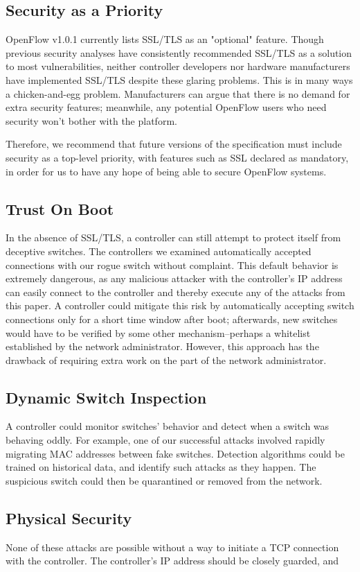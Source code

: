 \subsection{Security as a Priority}

OpenFlow v1.0.1 currently lists SSL/TLS as an "optional" feature. Though previous security analyses have consistently recommended SSL/TLS as a solution to most vulnerabilities, neither controller developers nor hardware manufacturers have implemented SSL/TLS despite these glaring problems. This is in many ways a chicken-and-egg problem. Manufacturers can argue that there is no demand for extra security features; meanwhile, any potential OpenFlow users who need security won't bother with the platform.

Therefore, we recommend that future versions of the specification must include security as a top-level priority, with features such as SSL declared as mandatory, in order for us to have any hope of being able to secure OpenFlow systems. 

\subsection{Trust On Boot}

In the absence of SSL/TLS,  a controller can still attempt to protect itself from deceptive switches. The controllers we examined automatically accepted connections with our rogue switch without complaint. This default behavior is extremely dangerous, as any malicious attacker with the controller's IP address can easily connect to the controller and thereby execute any of the attacks from this paper. A controller could mitigate this risk by automatically accepting switch connections only for a short time window after boot; afterwards, new switches would have to be verified by some other mechanism--perhaps a whitelist established by the network administrator. However, this approach has the drawback of requiring extra work on the part of the network administrator.

\subsection{Dynamic Switch Inspection}

A controller could monitor switches' behavior and detect when a switch was behaving oddly. For example, one of our successful attacks involved rapidly migrating MAC addresses between fake switches. Detection algorithms could be trained on historical data, and identify such attacks as they happen. The suspicious switch could then be quarantined or removed from the network.

\subsection{Physical Security}

None of these attacks are possible without a way to initiate a TCP connection with the controller. The controller's IP address should be closely guarded, and 